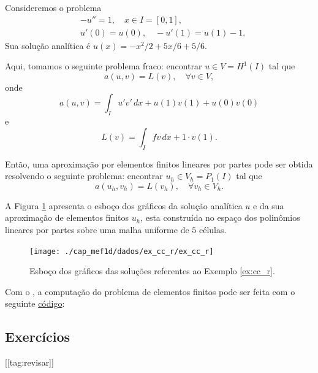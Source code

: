 \begin{ex}\label{ex:cc_r}
  Consideremos o problema
  \begin{align}
    &-u'' = 1,\quad x\in I=[0,1],\label{eq:ex_cc_r_eq}\\
    &u'(0) = u(0),\quad -u'(1) = u(1) - 1.\label{eq:ex_cc_r_bc}
  \end{align}
Sua solução analítica é $u(x) = -x^2/2+5x/6+5/6$. 

Aqui, tomamos o seguinte problema fraco: encontrar $u\in V=H^1(I)$ tal que
\begin{equation}
  a(u, v) = L(v),\quad\forall v\in V,
\end{equation}
onde
\begin{equation}
  a(u, v) = \int_I u'v'\,dx + u(1)v(1) + u(0)v(0)
\end{equation}
e
\begin{equation}
  L(v) = \int_I fv\,dx + 1\cdot v(1).
\end{equation}

Então, uma aproximação por elementos finitos lineares por partes pode ser obtida resolvendo o seguinte problema: encontrar $u_h\in V_h=P_1(I)$ tal que
\begin{equation}
  a(u_h, v_h) = L(v_h),\quad\forall v_h\in V_h.
\end{equation}

A Figura \ref{fig:ex_cc_r} apresenta o esboço dos gráficos da solução analítica $u$ e da sua aproximação de elementos finitos $u_h$, esta construída no espaço dos polinômios lineares por partes sobre uma malha uniforme de $5$ células.

\begin{figure}[h!]
  \centering
  \texttt{[image: ./cap\_mef1d/dados/ex\_cc\_r/ex\_cc\_r]}
  \caption{Esboço dos gráficos das soluções referentes ao Exemplo \ref{ex:cc_r}.}
  \label{fig:ex_cc_r}
\end{figure}

\ifispython
Com o \fenics, a computação do problema de elementos finitos pode ser feita com o seguinte \href{https://github.com/phkonzen/notas/blob/master/src/MetodoElementosFinitos/cap_mef1d/dados/ex_cc_r/ex_cc_r.py}{código}:

\fi
\end{ex}

\subsection{Exercícios}
[[tag:revisar]]

